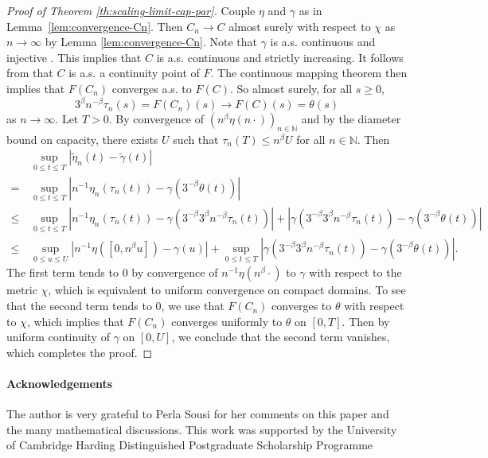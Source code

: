 \documentclass{article}
\newcommand{\N}{\mathbb{N}}
\newcommand{\1}{\mathbf{1}}
\theoremstyle{definition}
\numberwithin{equation}{section}
\numberwithin{theorem}{section}
\begin{document}
\begin{proof}[Proof of Theorem \ref{th:scaling-limit-cap-par}]
Couple $\eta$ and $\gamma$ as in Lemma~\ref{lem:convergence-Cn}. Then  $C_n\rightarrow C$ almost surely with respect to $\chi$ as $n\rightarrow\infty$ by Lemma \ref{lem:convergence-Cn}. Note that $\gamma$ is a.s. continuous and injective \cite[Section 9.1]{li2025convergence}. This implies that $C$ is a.s. continuous and strictly increasing. It follows from \cite[Corollary 13.6.4]{whitt2002stochastic} that $C$ is a.s. a continuity point of $F$. The continuous mapping theorem then implies that $F(C_n)$ converges a.s. to $F(C)$. So almost surely, for all $s\geq0$,
\begin{equation}
    3^{\beta}n^{-\beta}\tau_{n}(s)=F(C_{n})(s)\rightarrow F(C)(s)=\theta(s)
\end{equation}
as $n\rightarrow\infty$. Let $T>0$. By convergence of $(n^{\beta}\eta(n\cdot))_{n\in\N}$ and by the diameter bound on capacity, there exists $U$ such that $\tau_n(T)\leq n^\beta U$ for all $n\in\N$. Then
\begin{equation}
    \begin{split}
        &\,\sup_{0\leq t\leq T}|\widetilde{\eta}_n(t)-\widetilde\gamma(t)|\\
        =&\,\sup_{0\leq t\leq T}|n^{-1}\eta_n(\tau_n(t))-\gamma(3^{-\beta}\theta(t))|\\
        \leq&\,\sup_{0\leq t\leq T}|n^{-1}\eta_n(\tau_n(t))-\gamma(3^{-\beta}3^{\beta}n^{-\beta}\tau_n(t))|+|\gamma(3^{-\beta}3^{\beta}n^{-\beta}\tau_n(t))-\gamma(3^{-\beta}\theta(t))|\\
        \leq&\,\sup_{0\leq u\leq U}|n^{-1}\eta([0,n^{\beta}u])-\gamma(u)|+\sup_{0\leq t\leq T}|\gamma(3^{-\beta}3^{\beta}n^{-\beta}\tau_n(t))-\gamma(3^{-\beta}\theta(t))|.
    \end{split}
\end{equation}
The first term tends to 0 by convergence of $n^{-1}\eta(n^{\beta}\cdot)$ to $\gamma$ with respect to the metric $\chi$, which is equivalent to uniform convergence on compact domains. To see that the second term tends to 0, we use that $F(C_{n})$ converges to $\theta$ with respect to $\chi$, which implies that $F(C_n)$ converges uniformly to $\theta$ on $[0,T]$. Then by uniform continuity of $\gamma$ on $[0,U]$, we conclude that the second term vanishes, which completes the proof.
\end{proof}


\paragraph{Acknowledgements} The author is very grateful to Perla Sousi for her comments on this paper and the many mathematical discussions. This work was supported by the University of Cambridge Harding Distinguished Postgraduate Scholarship Programme




\end{document}
